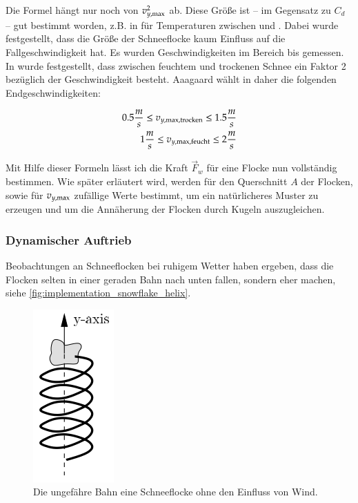 Die Formel hängt nur noch von $v_{y,\textnormal{max}}^2$
ab. Diese Größe ist -- im Gegensatz zu $C_d$ -- gut bestimmt worden,
z.B. in \cite{Hanesch1966} für Temperaturen zwischen 
und . Dabei wurde festgestellt,
dass die Größe der Schneeflocke kaum Einfluss auf die
Fallgeschwindigkeit hat. Es wurden Geschwindigkeiten im Bereich 
bis  gemessen. In
\cite{Centre1998} wurde festgestellt, dass zwischen feuchtem und
trockenen Schnee ein Faktor 2 bezüglich der Geschwindigkeit
besteht. Aaagaard wählt in \cite{Aagaard2004} daher die folgenden
Endgeschwindigkeiten:

\begin{align}
0.5 \frac{m}{s} \leq v_{y,\textnormal{max},\textnormal{trocken}} \leq 1.5 \frac{m}{s} \\
1 \frac{m}{s} \leq v_{y,\textnormal{max},\textnormal{feucht}} \leq 2 \frac{m}{s}
\end{align}

Mit Hilfe dieser Formeln lässt ich die Kraft $\vec{F}_w$ für eine
Flocke nun vollständig bestimmen. Wie später erläutert wird, werden
für den Querschnitt $A$ der Flocken, sowie für
$v_{y,\textnormal{max}}$ zufällige Werte bestimmt, um ein
natürlicheres Muster zu erzeugen und um die Annäherung der Flocken
durch Kugeln auszugleichen.

\subsubsection{Dynamischer Auftrieb}

Beobachtungen an Schneeflocken bei ruhigem Wetter haben ergeben, dass
die Flocken selten in einer geraden Bahn nach unten fallen, sondern
eher  machen, siehe
\autoref{fig:implementation_snowflake_helix}.

\begin{figure}[ht]
    \centering
    \includegraphics{images/snowflake_helix}
    \caption{Die ungefähre Bahn eine Schneeflocke ohne den Einfluss von Wind.}
    \label{fig:implementation_snowflake_helix}
\end{figure}

